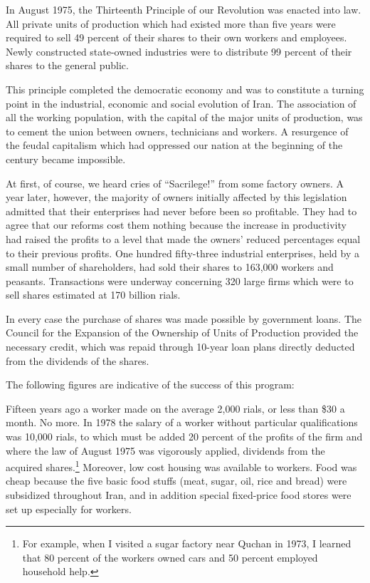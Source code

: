 In August 1975, the Thirteenth Principle of our Revolution was enacted into law. All private units of production which had existed more than five years were required to sell 49 percent of their shares to their own workers and employees. Newly constructed state-owned industries were to distribute 99 percent of their shares to the general public. 

This principle completed the democratic economy and was to constitute a turning point in the industrial, economic and social evolution of Iran. The association of all the working population, with the capital of the major units of production, was to cement the union between owners, technicians and workers. A resurgence of the feudal capitalism which had oppressed our nation at the beginning of the century became impossible. 

At first, of course, we heard cries of “Sacrilege!” from some factory owners. A year later, however, the majority of owners initially affected by this legislation admitted that their enterprises had never before been so profitable. They had to agree that our reforms cost them nothing because the increase in productivity had raised the profits to a level that made the owners’ reduced percentages equal to their previous profits. One hundred fifty-three industrial enterprises, held by a small number of shareholders, had sold their shares to 163,000 workers and peasants. Transactions were underway concerning 320 large firms which were to sell shares estimated at 170 billion rials. 

In every case the purchase of shares was made possible by government loans. The Council for the Expansion of the Ownership of Units of Production provided the necessary credit, which was repaid through 10-year loan plans directly deducted from the dividends of the shares. 

The following figures are indicative of the success of this program: 

Fifteen years ago a worker made on the average 2,000 rials, or less than \$30 a month. No more. In 1978 the salary of a worker without particular qualifications was 10,000 rials, to which must be added 20 percent of the profits of the firm and where the law of August 1975 was vigorously applied, dividends from the acquired shares.\footnote{For example, when I visited a sugar factory near Quchan in 1973, I learned that 80 percent of the workers owned cars and 50 percent employed household help.} Moreover, low cost housing was available to workers. Food was cheap because the five basic food stuffs (meat, sugar, oil, rice and bread) were subsidized throughout Iran, and in addition special fixed-price food stores were set up especially for workers. 

